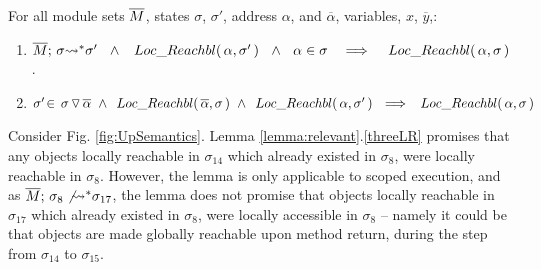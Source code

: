 {{\begin{lemma}
\label{lemma:relevant}
\label{lemma:push:N}
For all module sets $\overline{M}$, states $\sigma$, $\sigma'$,   address $\alpha$, and $\overline \alpha$, variables, $x$, $\overline {y}$,:
\begin{enumerate}
\item
\label{threeLR}
${\overline{M};\, {\sigma} {\rightsquigarrow^*} \sigma'} \ \ \wedge \ \   \,Loc\_Reachbl(\,\alpha,\sigma'\,)\  \ \wedge\ \  {\alpha\in \sigma} \ \ \ \Longrightarrow \ \ \ \,Loc\_Reachbl(\,\alpha,\sigma\,)$.
\item
\label{oneLR}
{$ \sigma'\!\in\! \PushS {\alpha} {\sigma}   \ \wedge  \  \LRelevant {\overline \alpha} {\sigma}  \ \wedge\    \LRelevant \alpha {\sigma'} \ \  \Longrightarrow\ \ 
 \LRelevant \alpha {\sigma}$
}
\end{enumerate}
\end{lemma}

{Consider Fig.  \ref{fig:UpSemantics}. %
Lemma \ref{lemma:relevant}.\ref{threeLR}  promises that any objects locally reachable in $\sigma_{14}$ which already existed in $\sigma_{8}$, were locally reachable in $\sigma_{8}$. However, the lemma is only  applicable to scoped execution, and as 
$\overline{M};\, {\sigma_8} \not{\rightsquigarrow^*} \sigma_{17}$, 
the lemma does not promise that  objects locally reachable in $\sigma_{17}$ which already existed in $\sigma_{8}$, were locally accessible in $\sigma_{8}$ -- namely it could be that objects are made globally reachable upon method return, during the step from $\sigma_{14}$ to $\sigma_{15}$.}

}}
